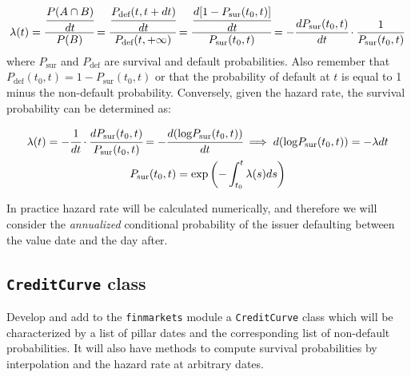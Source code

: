 \begin{equation}
\lambda(t) = \cfrac{\cfrac{P(A\cap B)}{dt}}{P(B)} = \cfrac{\cfrac{P_{\textrm{def}}(t, t+dt)}{dt}}{P_{\textrm{def}}(t, +\infty)} = \cfrac{\cfrac{d[1-P_{\textrm{sur}}(t_0, t)]}{dt}}{P_{\textrm{sur}}(t_0, t)} = -\cfrac{dP_{\textrm{sur}}(t_0, t)}{dt}\cdot\frac{1}{P_{\textrm{sur}}(t_0, t)}
\end{equation}
where $P_{\textrm{sur}}$ and $P_{\textrm{def}}$ are survival and default probabilities.
Also remember that $P_{\textrm{def}}(t_0, t) = 1 - P_{\textrm{sur}}(t_0, t)$ or that the probability of default at $t$ is equal to 1 minus the non-default probability. Conversely, given the hazard rate, the survival probability can be determined as:

\begin{equation}
\begin{gathered}
\lambda(t) = -\cfrac{1}{dt}\cdot\cfrac{dP_{\textrm{sur}}(t_0, t)}{P_{\textrm{sur}}(t_0, t)} = -\cfrac{d(\textrm{log}P_{\textrm{sur}}(t_0, t))}{dt} \implies d(\textrm{log}P_{\textrm{sur}}(t_0, t)) = -\lambda dt\\
P_{\textrm{sur}}(t_0, t) = \mathrm{exp}\left(-\int_{t_0}^{t}\lambda(s) ds\right)
\end{gathered}
\end{equation}

In practice hazard rate will be calculated numerically, and therefore we will consider the \emph{annualized} conditional probability of the issuer defaulting between the value date and the day after.

\subsection{\texttt{CreditCurve} class}

\begin{finmarkets}
Develop and add to the \texttt{finmarkets} module a \texttt{CreditCurve} class which will be characterized by a list of pillar dates and the corresponding list of non-default probabilities. It will also have methods to compute survival probabilities by interpolation and the hazard rate at arbitrary dates.
\end{finmarkets}
  
